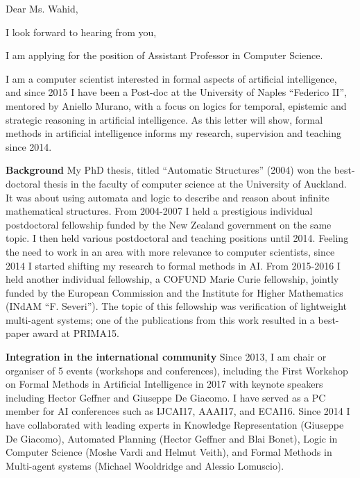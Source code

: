 \documentclass[10,a4paper,sans]{moderncv}
\begin{document}
\date{June 20, 2017}
\opening{Dear Ms. Wahid,}
\closing{I look forward to hearing from you,\vspace{-1cm}}

\makelettertitle



I am applying for the position of Assistant Professor in Computer Science. 

I am a computer scientist interested in formal aspects of artificial intelligence, and since 2015 I have been a Post-doc at the University of Naples ``Federico II'', mentored by Aniello Murano, with a focus on logics for temporal, epistemic and strategic reasoning in artificial intelligence. As this letter will show, formal methods in artificial intelligence informs my research, supervision and teaching since 2014.

\textbf{Background}
My PhD thesis, titled ``Automatic Structures'' (2004) won the best-doctoral thesis in the faculty of computer science at the University of Auckland. It was about using automata and logic to describe and reason about infinite 
mathematical structures. From 2004-2007 I held a prestigious individual postdoctoral fellowship funded by the New Zealand government on the same topic. I then held various postdoctoral and teaching positions until 2014. Feeling the need to work in an area with more relevance to computer scientists, since 2014 I started shifting my research to formal methods in AI. From 2015-2016 I held another individual fellowship, a COFUND Marie Curie fellowship, 
jointly funded by the European Commission and the Institute for Higher Mathematics (INdAM ``F. Severi''). The topic of this fellowship was verification of lightweight multi-agent systems; one of the publications from this work resulted in a best-paper award at PRIMA15. 

\textbf{Integration in the international community}
Since 2013, I am chair or organiser of 5 events (workshops and conferences), including the First Workshop on Formal Methods in Artificial Intelligence in 2017 with keynote speakers including Hector Geffner and Giuseppe De Giacomo. I have served 
as a PC member for AI conferences such as IJCAI17, AAAI17, and ECAI16. Since 2014 I have collaborated with leading experts in Knowledge Representation (Giuseppe De Giacomo), Automated Planning (Hector Geffner and Blai Bonet), Logic in Computer Science (Moshe Vardi and Helmut Veith), and Formal Methods in Multi-agent systems (Michael Wooldridge and Alessio Lomuscio). 
\end{document}
